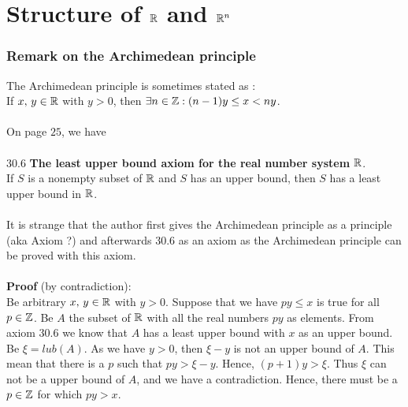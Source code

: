 \chapter{Structure of $\mathbb{R}$ and $\mathbb{R}^{n}$}
\pagebreak[4]

\subsection*{Remark on the Archimedean principle}
The Archimedean principle is sometimes stated as :\\
If $x,\,y\in \mathbb{R}$ with $y>0$, then $\exists n\in \mathbb{Z}: (n-1)y\leq x < ny$.\\\\
On page $25$, we have \\\\
$\mathbf{30.6}$ \textbf{The least upper bound axiom for the real number system} $\mathbf{\mathbb{R}}$.\\
If $S$ is a nonempty subset of $\mathbb{R}$ and $S$ has an upper bound, then $S$ has a least upper bound in $\mathbb{R}$.\\\\
It is strange that  the author first gives the Archimedean principle as a principle (aka Axiom ?) and afterwards $\mathbf{30.6}$ as an axiom as the Archimedean principle can be proved with this axiom. \\\\
\textbf{Proof} (by contradiction):\\
Be arbitrary $x,\, y\in \mathbb{R}$ with $y> 0$. Suppose that we have $py\leq x$ is true for all $p\in \mathbb{Z}$. Be $A$ the subset of $\mathbb{R}$ with all the real numbers $py$ as elements. From axiom $\mathbf{30.6}$ we know that $A$ has a least upper bound with $x$ as an upper bound. Be $\xi= lub(A)$. As we have $y>0$, then $\xi -y$ is not an upper bound of $A$.  This mean that there is a $p$ such that $py>\xi -y$. Hence, $ (p+1)y>\xi$. Thus $\xi$ can not be a upper bound of $A$, and we have a contradiction. Hence, there must be a $p\in \mathbb{Z}$ for which $py>x$.
\newpage
\renewcommand{\thesubsection}{\thesection.\arabic{subsection}}
\setcounter{subsection}{0}
